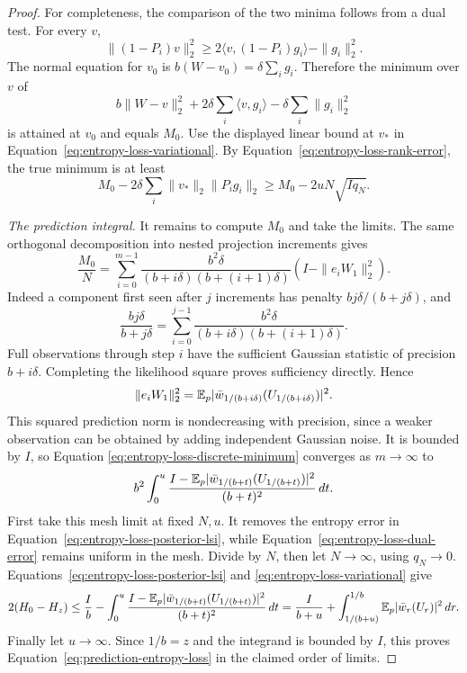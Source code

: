 \begin{proof}
For completeness, the comparison of the two minima follows from a
dual test.  For every $v$,
\[
 \|(1-P_i)v\|_2^2
 \ge2\langle v,(1-P_i)g_i\rangle-\|g_i\|_2^2.
\]
The normal equation for $v_0$ is
$b(W-v_0)=\delta\sum_i g_i$.  Therefore the minimum over $v$ of
\[
 b\|W-v\|_2^2+2\delta\sum_i\langle v,g_i\rangle
                  -\delta\sum_i\|g_i\|_2^2
\]
is attained at $v_0$ and equals $M_0$.  Use the displayed linear bound
at $v_*$ in Equation~\eqref{eq:entropy-loss-variational}.  By
Equation~\eqref{eq:entropy-loss-rank-error}, the true minimum is at least
\begin{equation}
 M_0-2\delta\sum_i\|v_*\|_2\|P_ig_i\|_2
 \ge M_0-2uN\sqrt{Iq_N}.
 \label{eq:entropy-loss-dual-error}
\end{equation}

\emph{The prediction integral.}
It remains to compute $M_0$ and take the limits. The same orthogonal
decomposition into nested projection increments gives
\begin{equation}
 \frac{M_0}{N}
 =\sum_{i=0}^{m-1}
 \frac{b^2\delta}{(b+i\delta)(b+(i+1)\delta)}
       \left(I-\|e_iW_1\|_2^2\right).
 \label{eq:entropy-loss-discrete-minimum}
\end{equation}
Indeed a component first seen after $j$ increments has penalty
$bj\delta/(b+j\delta)$, and
\[
 \frac{bj\delta}{b+j\delta}
 =\sum_{i=0}^{j-1}
   \frac{b^2\delta}{(b+i\delta)(b+(i+1)\delta)}.
\]
Full observations through step $i$ have the sufficient Gaussian
statistic of precision $b+i\delta$.  Completing the likelihood square
proves sufficiency directly.  Hence
\[
 \|e_iW_1\|_2^2
 =\mathbb E_p|\bar w_{1/(b+i\delta)}(U_{1/(b+i\delta)})|^2.
\]
This squared prediction norm is nondecreasing with precision, since a
weaker observation can be obtained by adding independent Gaussian
noise.  It is bounded by $I$, so Equation
\eqref{eq:entropy-loss-discrete-minimum} converges as $m\to\infty$ to
\[
 b^2\int_0^u
 \frac{I-\mathbb E_p|\bar w_{1/(b+t)}(U_{1/(b+t)})|^2}{(b+t)^2}\,dt.
\]
First take this mesh limit at fixed $N,u$.  It removes the entropy
error in Equation~\eqref{eq:entropy-loss-posterior-lsi}, while
Equation~\eqref{eq:entropy-loss-dual-error} remains uniform in the
mesh.  Divide by $N$, then let $N\to\infty$, using $q_N\to0$.
Equations~\eqref{eq:entropy-loss-posterior-lsi} and
\eqref{eq:entropy-loss-variational} give
\[
 2(H_0-H_z)
 \le\frac Ib-\int_0^u
 \frac{I-\mathbb E_p|\bar w_{1/(b+t)}(U_{1/(b+t)})|^2}{(b+t)^2}\,dt
 =\frac{I}{b+u}
   +\int_{1/(b+u)}^{1/b}\mathbb E_p|\bar w_r(U_r)|^2\,dr.
\]
Finally let $u\to\infty$.  Since $1/b=z$ and the integrand is bounded
by $I$, this proves Equation~\eqref{eq:prediction-entropy-loss} in the
claimed order of limits.
\end{proof}

